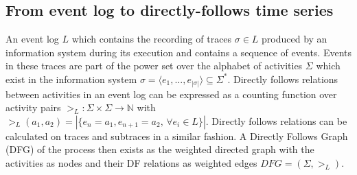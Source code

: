 \subsection{From event log to directly-follows time series}\label{sec:3a:preliminaries}

An event log $L$ which contains the recording of traces $\sigma \in L$ produced by an information system during its execution and contains a sequence of events.
Events in these traces are part of the power set over the alphabet of activities $\Sigma$ which exist in the information system $\sigma=\langle e_1,...,e_{|\sigma|}\rangle \subseteq \Sigma^*$.
Directly follows relations between activities in an event log can be expressed as a counting function over activity pairs $>_L: \Sigma\times\Sigma \to \mathbb{N}$ with $>_L(a_1,a_2) = |\{e_n=a_1,e_{n+1}=a_2, \,\forall e_i\in L\}|$.
Directly follows relations can be calculated on traces and subtraces in a similar fashion.
A Directly Follows Graph (DFG) of the process then exists as the weighted directed graph with the activities as nodes and their DF relations as weighted edges $DFG=(\Sigma,>_L)$.

